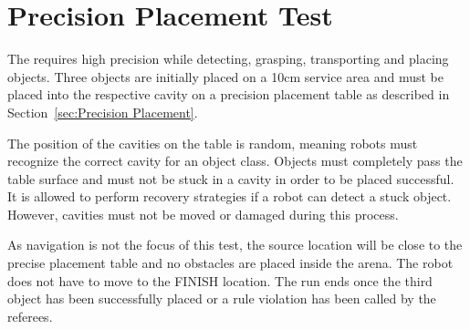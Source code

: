 \newpage
\section{Precision Placement Test}
\label{sec:Precision Placement Test}

The  requires high precision while detecting, grasping, transporting and placing objects. Three objects are initially placed on a 10cm service area and must be placed into the respective cavity on a precision placement table as described in Section~\ref{sec:Precision Placement}.

The position of the cavities on the table is random, meaning robots must recognize the correct cavity for an object class. Objects must completely pass the table surface and must not be stuck in a cavity in order to be placed successful. It is allowed to perform recovery strategies if a robot can detect a stuck object.
However, cavities must not be moved or damaged during this process.

As navigation is not the focus of this test, the source location will be close to the precise placement table and no obstacles are placed inside the arena. The robot does not have to move to the FINISH location. The run ends once the third object has been successfully placed or a rule violation has been called by the referees.


